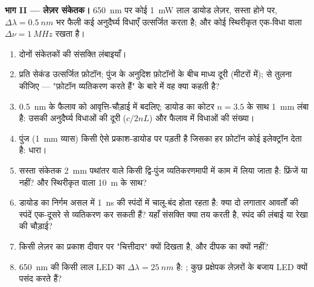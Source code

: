 \begin{problem}
\medskip
\noindent\textbf{भाग II --- लेज़र संकेतक।}
\qty{650}{nm} पर कोई \qty{1}{mW} लाल डायोड लेज़र, सस्ता होने पर, $\Delta\lambda = \qty{0.5}{nm}$
भर फैली कई अनुदैर्घ्य विधाएँ उत्सर्जित करता है; और कोई स्थिरीकृत
एक-विधा वाला $\Delta\nu = \qty{1}{MHz}$ रखता है।
\begin{enumerate}[resume]
  \item दोनों संकेतकों की संसक्ति लंबाइयाँ।
  \item प्रति सेकंड उत्सर्जित फ़ोटॉन; पुंज के अनुदिश फ़ोटॉनों के बीच माध्य
        दूरी (मीटरों में);  से तुलना कीजिए ---
        "फ़ोटॉन व्यतिकरण करते हैं" के बारे में वह क्या कहती है?
  \item \qty{0.5}{nm} के फैलाव को आवृत्ति-चौड़ाई में बदलिए; डायोड का
        कोटर $n = 3.5$ के साथ \qty{1}{mm} लंबा है: उसकी अनुदैर्घ्य
        विधाओं की दूरी ($c/2nL$) और फैलाव में विधाओं की संख्या।
  \item पुंज (\qty{1}{mm} व्यास) किसी ऐसे प्रकाश-डायोड पर पड़ती है जिसका
        हर फ़ोटॉन कोई इलेक्ट्रॉन देता है: धारा।
  \item सस्ता संकेतक \qty{2}{mm} पथांतर वाले किसी द्वि-पुंज व्यतिकरणमापी में
        काम में लिया जाता है: फ्रिंजें या नहीं? और स्थिरीकृत वाला
        \qty{10}{m} के साथ?
  \item डायोड का निर्गम असल में \qty{1}{ns} की स्पंदों में चालू-बंद होता
        रहता है: क्या दो लगातार आवर्तों की स्पंदें एक-दूसरे से
        व्यतिकरण कर सकती हैं? यहाँ संसक्ति क्या तय करती है, स्पंद
        की लंबाई या रेखा की चौड़ाई?
  \item किसी लेज़र का प्रकाश दीवार पर "चित्तीदार" क्यों दिखता है, और
        दीपक का क्यों नहीं?
  \item \qty{650}{nm} की किसी लाल LED का $\Delta\lambda = \qty{25}{nm}$ है: ; कुछ प्रक्षेपक लेज़रों के बजाय LED क्यों पसंद करते हैं?
\end{enumerate}


\end{problem}
